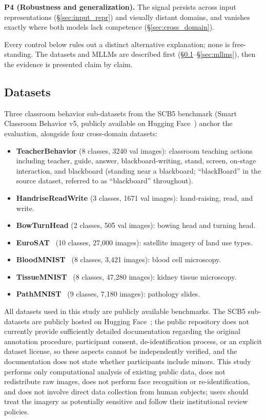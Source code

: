 \documentclass[a4paper,fleqn]{cas-sc}
\begin{document}
\textbf{P4 (Robustness and generalization).} The signal persists across input representations (\S\ref{sec:input_repr}) and visually distant domains, and vanishes exactly where both models lack competence (\S\ref{sec:cross_domain}).

Every control below rules out a distinct alternative explanation; none is free-standing. The datasets and MLLMs are described first (\S\ref{sec:datasets}--\S\ref{sec:mllms}), then the evidence is presented claim by claim.

\subsection{Datasets}
\label{sec:datasets}

Three classroom behavior sub-datasets from the SCB5 benchmark (Smart Classroom Behavior v5, publicly available on Hugging Face~\cite{scb_dataset}) anchor the evaluation, alongside four cross-domain datasets:

\begin{itemize}
    \item \textbf{TeacherBehavior} (8 classes, 3240 val images): classroom teaching actions including teacher, guide, answer, blackboard-writing, stand, screen, on-stage interaction, and blackboard (standing near a blackboard; ``blackBoard'' in the source dataset, referred to as ``blackboard'' throughout).
    \item \textbf{HandriseReadWrite} (3 classes, 1671 val images): hand-raising, read, and write.
    \item \textbf{BowTurnHead} (2 classes, 505 val images): bowing head and turning head.
    \item \textbf{EuroSAT}~\cite{helber2019eurosat} (10 classes, 27{,}000 images): satellite imagery of land use types.
    \item \textbf{BloodMNIST}~\cite{yang2023medmnist} (8 classes, 3{,}421 images): blood cell microscopy.
    \item \textbf{TissueMNIST}~\cite{yang2023medmnist} (8 classes, 47{,}280 images): kidney tissue microscopy.
    \item \textbf{PathMNIST}~\cite{yang2023medmnist} (9 classes, 7{,}180 images): pathology slides.
\end{itemize}

All datasets used in this study are publicly available benchmarks. The SCB5 sub-datasets are publicly hosted on Hugging Face~\cite{scb_dataset}; the public repository does not currently provide sufficiently detailed documentation regarding the original annotation procedure, participant consent, de-identification process, or an explicit dataset license, so these aspects cannot be independently verified, and the documentation does not state whether participants include minors. This study performs only computational analysis of existing public data, does not redistribute raw images, does not perform face recognition or re-identification, and does not involve direct data collection from human subjects; users should treat the imagery as potentially sensitive and follow their institutional review policies.
\end{document}
